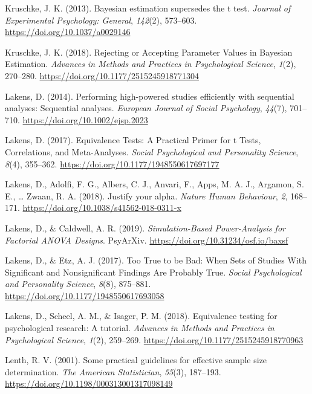 \documentclass[
  english,
  ,jou, a4paper,floatsintext]{apa6}
\newlength{\cslhangindent}
\newenvironment{cslreferences}%
  {\setlength{\parindent}{0pt}%
  \everypar{\setlength{\hangindent}{\cslhangindent}}\ignorespaces}%
  {\par}
\begin{document}
\begin{cslreferences}
\leavevmode\hypertarget{ref-kruschke_bayesian_2013}{}%
Kruschke, J. K. (2013). Bayesian estimation supersedes the t test. \emph{Journal of Experimental Psychology: General}, \emph{142}(2), 573--603. \url{https://doi.org/10.1037/a0029146}

\leavevmode\hypertarget{ref-kruschke_rejecting_2018}{}%
Kruschke, J. K. (2018). Rejecting or Accepting Parameter Values in Bayesian Estimation. \emph{Advances in Methods and Practices in Psychological Science}, \emph{1}(2), 270--280. \url{https://doi.org/10.1177/2515245918771304}

\leavevmode\hypertarget{ref-lakens_performing_2014}{}%
Lakens, D. (2014). Performing high-powered studies efficiently with sequential analyses: Sequential analyses. \emph{European Journal of Social Psychology}, \emph{44}(7), 701--710. \url{https://doi.org/10.1002/ejsp.2023}

\leavevmode\hypertarget{ref-lakens_equivalence_2017}{}%
Lakens, D. (2017). Equivalence Tests: A Practical Primer for t Tests, Correlations, and Meta-Analyses. \emph{Social Psychological and Personality Science}, \emph{8}(4), 355--362. \url{https://doi.org/10.1177/1948550617697177}

\leavevmode\hypertarget{ref-lakens_justify_2018}{}%
Lakens, D., Adolfi, F. G., Albers, C. J., Anvari, F., Apps, M. A. J., Argamon, S. E., \ldots{} Zwaan, R. A. (2018). Justify your alpha. \emph{Nature Human Behaviour}, \emph{2}, 168--171. \url{https://doi.org/10.1038/s41562-018-0311-x}

\leavevmode\hypertarget{ref-lakens_simulation-based_2019}{}%
Lakens, D., \& Caldwell, A. R. (2019). \emph{Simulation-Based Power-Analysis for Factorial ANOVA Designs}. PsyArXiv. \url{https://doi.org/10.31234/osf.io/baxsf}

\leavevmode\hypertarget{ref-lakens_too_2017}{}%
Lakens, D., \& Etz, A. J. (2017). Too True to be Bad: When Sets of Studies With Significant and Nonsignificant Findings Are Probably True. \emph{Social Psychological and Personality Science}, \emph{8}(8), 875--881. \url{https://doi.org/10.1177/1948550617693058}

\leavevmode\hypertarget{ref-lakens_equivalence_2018}{}%
Lakens, D., Scheel, A. M., \& Isager, P. M. (2018). Equivalence testing for psychological research: A tutorial. \emph{Advances in Methods and Practices in Psychological Science}, \emph{1}(2), 259--269. \url{https://doi.org/10.1177/2515245918770963}

\leavevmode\hypertarget{ref-lenth_practical_2001}{}%
Lenth, R. V. (2001). Some practical guidelines for effective sample size determination. \emph{The American Statistician}, \emph{55}(3), 187--193. \url{https://doi.org/10.1198/000313001317098149}


\end{cslreferences}
\end{document}

